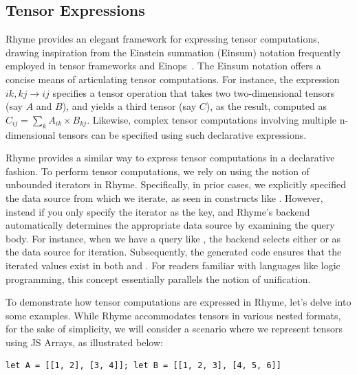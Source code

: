 \documentclass[runningheads]{llncs}
\newcommand{\lang}{Rhyme}
\begin{document}



\vspace{-4mm}
\subsection{Tensor Expressions}\label{subsec:tensor}

\lang{} provides an elegant framework for expressing tensor computations,
drawing inspiration from the Einstein summation (Einsum) notation frequently
employed in tensor frameworks and Einops~\cite{einops}.
The Einsum notation offers a concise means of articulating tensor computations.
For instance, the expression $ik,kj \rightarrow ij$ specifies a tensor operation
that takes two two-dimensional tensors (say $A$ and $B$), and yields a third
tensor (say $C$), as the result, computed as $C_{ij} = \sum_k A_{ik} \times B_{kj}$.
Likewise, complex tensor computations involving multiple n-dimensional tensors can
be specified using such declarative expressions.

\lang{} provides a similar way to express tensor computations in a declarative fashion.
To perform tensor computations, we rely on using the notion of unbounded iterators in \lang{}.
Specifically, in prior cases, we explicitly specified the data source from which we iterate,
as seen in constructs like .
However, instead if you only specify the iterator as the key, and \lang{}'s backend
automatically determines the appropriate data source by examining the query body.
For instance, when we have a query like , the
backend selects either  or  as the data source for iteration.
Subsequently, the generated code ensures that the iterated values exist in
both  and .
For readers familiar with languages like logic programming, this concept essentially
parallels the notion of unification.

To demonstrate how tensor computations are expressed in \lang{}, let's delve into
some examples.
While \lang{} accommodates tensors in various nested formats, for the sake of simplicity,
we will consider a scenario where we represent tensors using JS Arrays, as illustrated below:
\begin{lstlisting}[style=JavaScript,columns=flexible]
let A = [[1, 2], [3, 4]]; let B = [[1, 2, 3], [4, 5, 6]]
\end{lstlisting}
\end{document}
